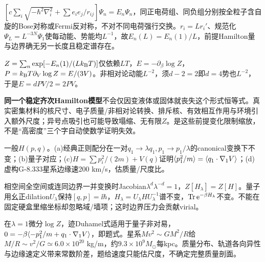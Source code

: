 \begin{solution}
$[c\sum_i\sqrt{-\hbar^2\nabla_i^2}+\sum e_ie_j/r_{ij}]\Psi_n=E_n\Psi_n$，同正电荷组、同负组分别按全粒子含自旋的Bose对称或Fermi反对称，不对不同电荷强行交换。$r_i=Lr_i'$、规范化$\Psi_L=L^{-3N}\Psi_1$使每动能、势能均$L^{-1}$，故$E_n(L)=E_n(1)/L$，前提Hamilton量与边界确无另一长度且稳定谱存在。

$Z=\sum_n\exp[-E_n(1)/(Lk_{\mathrm B} T)]$仅依赖$LT$，$E=-\partial_\beta\log Z$，$P=k_{\mathrm B} T\partial_V\log Z=E/(3V)$。非相对论动能$L^{-2}$，须$d-2=2$即$d=4$势也$L^{-2}$，于是$E=dPV/2=2PV$。

\textbf{同一个稳定齐次Hamilton模型}不会仅因变液体或固体就丧失这个形式恒等式。真实密集材料的核尺寸、电子质量/非相对论转换、排斥核、有效相互作用与环境引入额外尺度；异号点吸引也可能导致塌缩、无有限$Z$。是这些前提变化限制缩放，不是“高密度”三个字自动使数学证明失效。
\end{solution}
\begin{exercise}[原题10(a)--(d)]\label{r:333-3-10}
一般$H(p,q)$。(a)经典正则配分在一对$q_1\to\lambda q_1,p_1\to p_1/\lambda$的canonical变换下不变；(b)量子对应；(c)$H=\sum p_i^2/(2m)+V(q)$证明$\langle p_1^2/m\rangle=\langle q_1\cdot\nabla_1V\rangle$；(d)虚构G-8.333星系边缘速200 km/s，估质量/尺度比。
\end{exercise}
\begin{solution}
相空间全空间或连同边界一并变换时Jacobian$\lambda^d\lambda^{-d}=1$，$Z[H_\lambda]=Z[H]$。量子用幺正dilation$U_\lambda$保持$[q,p]=\ii\hbar$，$H_\lambda=U_\lambda H U_\lambda^{-1}$谱不变，$\operatorname{Tr}\mathrm e^{-\beta H_\lambda}$不变。不能在固定硬盒里缩坐标却忽略域/墙项；这时边界压力会贡献virial。

在$\lambda=1$微分$\log Z$，迹Duhamel式适用于量子非对易，$0=-\beta\langle -p_1^2/m+q_1\cdot\nabla_1V\rangle$，即题式。星系$Mv^2\sim GM^2/R$给$M/R\sim v^2/G\simeq6.0\times10^{20}$ kg/m，约$9.3\times10^9M_\odot$每kpc。质量分布、轨道各向异性与边缘速定义带来常数阶差，题给速度只能估尺度，不确定完整质量剖面。
\end{solution}
